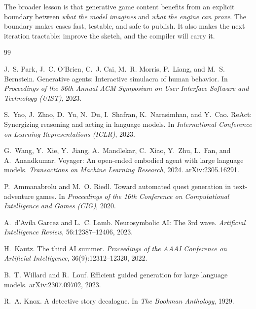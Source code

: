 ﻿\documentclass[11pt,a4paper]{report}
\begin{document}
The broader lesson is that generative game content benefits from an explicit boundary between \emph{what the model imagines} and \emph{what the engine can prove}. The boundary makes cases fast, testable, and safe to publish. It also makes the next iteration tractable: improve the sketch, and the compiler will carry it.

\clearpage
{}
{}
\begin{thebibliography}{99}
\small

J.~S. Park, J.~C. O'Brien, C.~J. Cai, M.~R. Morris, P.~Liang, and M.~S. Bernstein.
\newblock Generative agents: Interactive simulacra of human behavior.
\newblock In \emph{Proceedings of the 36th Annual ACM Symposium on User Interface Software and Technology (UIST)}, 2023.

S.~Yao, J.~Zhao, D.~Yu, N.~Du, I.~Shafran, K.~Narasimhan, and Y.~Cao.
\newblock ReAct: Synergizing reasoning and acting in language models.
\newblock In \emph{International Conference on Learning Representations (ICLR)}, 2023.

G.~Wang, Y.~Xie, Y.~Jiang, A.~Mandlekar, C.~Xiao, Y.~Zhu, L.~Fan, and A.~Anandkumar.
\newblock Voyager: An open-ended embodied agent with large language models.
\newblock \emph{Transactions on Machine Learning Research}, 2024. arXiv:2305.16291.

P.~Ammanabrolu and M.~O. Riedl.
\newblock Toward automated quest generation in text-adventure games.
\newblock In \emph{Proceedings of the 16th Conference on Computational Intelligence and Games (CIG)}, 2020.

A.~d'Avila Garcez and L.~C. Lamb.
\newblock Neurosymbolic AI: The 3rd wave.
\newblock \emph{Artificial Intelligence Review}, 56:12387--12406, 2023.

H.~Kautz.
\newblock The third AI summer.
\newblock \emph{Proceedings of the AAAI Conference on Artificial Intelligence}, 36(9):12312--12320, 2022.

B.~T. Willard and R.~Louf.
\newblock Efficient guided generation for large language models.
\newblock arXiv:2307.09702, 2023.

R.~A. Knox.
\newblock A detective story decalogue.
\newblock In \emph{The Bookman Anthology}, 1929.


\end{thebibliography}
\end{document}
